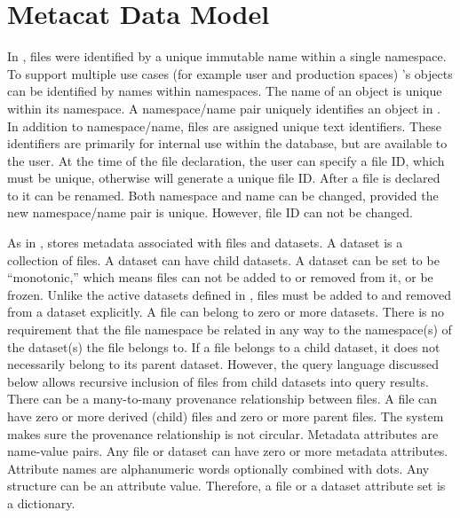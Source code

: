\documentclass[../main-v1.tex]{subfiles}
\begin{document}
\section{Metacat Data Model }
In , files were identified by a unique immutable name within a single namespace.  To support  multiple use cases (for example user and production spaces) 's objects %
can be identified  by names within namespaces. The name of an object is unique within its namespace. A namespace/name pair uniquely identifies  an object in . In addition to namespace/name, files are assigned unique text identifiers. These identifiers are primarily for internal use within the  database, but are available to the user. At the time of the file declaration, the user can specify a file ID, which must be unique, otherwise  will generate a unique file ID. After a file is declared to  it can be renamed. Both namespace and name can be changed, provided the new namespace/name pair is unique. However, file ID can not be changed. 

As in ,  stores metadata associated with files and datasets. 
A dataset is a collection of files. A dataset can have child datasets.  A dataset can be set to be ``monotonic,'' which means files can not be added to or removed from it, or be frozen. %
Unlike the active datasets defined   in , files must be added to and removed from a dataset explicitly.
A file can belong to zero or more datasets. There is no requirement that the file namespace  be related in any way to the namespace(s) of the dataset(s) the file belongs to. If a file belongs to a child dataset, it does not %
necessarily belong to its parent dataset. However, the query language discussed below allows recursive inclusion of files from child datasets into query results.
There can be a many-to-many provenance relationship between files. A file can have zero or more derived (child) files and zero or more parent files. The system makes sure the provenance relationship is not circular. 
Metadata attributes are name-value pairs. Any file or dataset can have zero or more metadata attributes. Attribute names are alphanumeric words optionally combined with dots. Any  structure can be an attribute value. Therefore, a file or a dataset attribute set is a  dictionary. 
\end{document}

